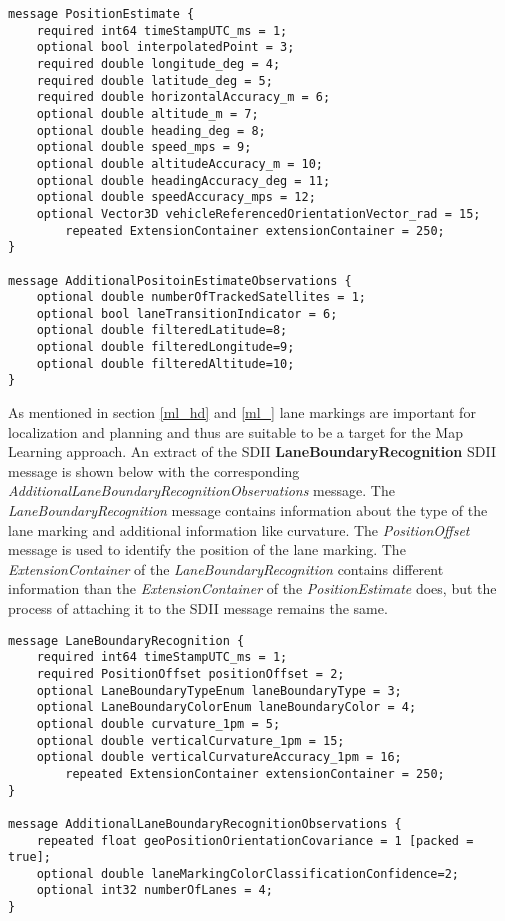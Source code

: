\begin{lstlisting}[backgroundcolor=\color{lightlightgray}, title={\emph{PositionEstimate} and \emph{AdditionalPositionEstimateObservations} protobuf definition}, label=mfl::posEst]
message PositionEstimate {
    required int64 timeStampUTC_ms = 1;
    optional bool interpolatedPoint = 3;
    required double longitude_deg = 4;
    required double latitude_deg = 5;
    required double horizontalAccuracy_m = 6;
    optional double altitude_m = 7;
    optional double heading_deg = 8;
    optional double speed_mps = 9;
    optional double altitudeAccuracy_m = 10;
    optional double headingAccuracy_deg = 11;
    optional double speedAccuracy_mps = 12;
    optional Vector3D vehicleReferencedOrientationVector_rad = 15;
		repeated ExtensionContainer extensionContainer = 250;
}

message AdditionalPositoinEstimateObservations {
    optional double numberOfTrackedSatellites = 1;
    optional bool laneTransitionIndicator = 6;
    optional double filteredLatitude=8;
    optional double filteredLongitude=9;
    optional double filteredAltitude=10;
}
\end{lstlisting}
\par
As mentioned in section \ref{ml_hd} and \ref{ml_} lane markings are important for localization and planning and thus are suitable to be a target for the Map Learning approach. An extract of the SDII \textbf{LaneBoundaryRecognition} SDII message is shown below with the corresponding \emph{AdditionalLaneBoundaryRecognitionObservations} message. The \emph{LaneBoundaryRecognition} message contains information about the type of the lane marking and additional information like curvature. The \emph{PositionOffset} message is used to identify the position of the lane marking. The \emph{ExtensionContainer} of the \emph{LaneBoundaryRecognition} contains different information than the \emph{ExtensionContainer} of the \emph{PositionEstimate} does, but the process of attaching it to the SDII message remains the same.
\begin{lstlisting}[backgroundcolor=\color{lightlightgray}, title={\emph{LaneBoundaryRecognition} and \emph{AdditionalLaneBoundaryRecognitionObservations} protobuf definition}]
message LaneBoundaryRecognition {
    required int64 timeStampUTC_ms = 1;
    required PositionOffset positionOffset = 2;
    optional LaneBoundaryTypeEnum laneBoundaryType = 3;
    optional LaneBoundaryColorEnum laneBoundaryColor = 4;
    optional double curvature_1pm = 5;
    optional double verticalCurvature_1pm = 15;
    optional double verticalCurvatureAccuracy_1pm = 16;
		repeated ExtensionContainer extensionContainer = 250;
}

message AdditionalLaneBoundaryRecognitionObservations {
    repeated float geoPositionOrientationCovariance = 1 [packed = true];
    optional double laneMarkingColorClassificationConfidence=2;
    optional int32 numberOfLanes = 4;
}
\end{lstlisting}
